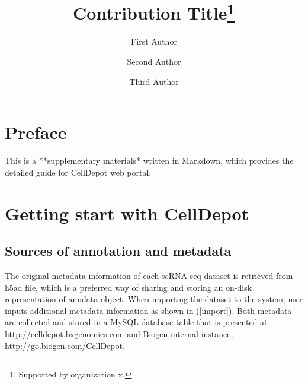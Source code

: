 \documentclass[runningheads]{llncs}
\begin{document}
\title{Contribution Title\thanks{Supported by organization x.}}
%
%
\author{First Author \and
Second Author \and
Third Author}
%
%

\maketitle

{
\setcounter{tocdepth}{1}
\tableofcontents
}
\hypertarget{preface}{%
\chapter{Preface}\label{preface}}

This is a **supplementary materials* written in Markdown, which provides the detailed guide for CellDepot web portal.

\hypertarget{getting-start-with-celldepot}{%
\chapter{Getting start with CellDepot}\label{getting-start-with-celldepot}}

\hypertarget{sources-of-annotation-and-metadata}{%
\section{Sources of annotation and metadata}\label{sources-of-annotation-and-metadata}}

The original metadata information of each scRNA-seq dataset is retrieved from h5ad file, which is a preferred way of sharing and storing an on-disk representation of anndata object. When importing the dataset to the system, user inputs additional metadata information as shown in (\ref{import}). Both metadata are collected and stored in a MySQL database table that is presented at \url{http://celldepot.bxgenomics.com} and Biogen internal instance, \url{http://go.biogen.com/CellDepot}.
\end{document}
